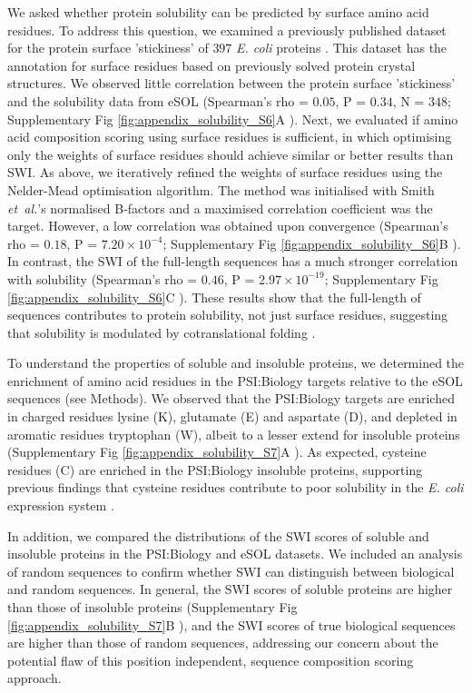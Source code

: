 We asked whether protein solubility can be predicted by surface amino acid residues. To address this question, we examined a previously published dataset for the protein surface 'stickiness’ of $397$ \textit{E. coli} proteins \citep{Levy2012-ct}. This dataset has the annotation for surface residues based on previously solved protein crystal structures. We observed little correlation between the protein surface 'stickiness' and the solubility data from eSOL (Spearman’s rho = $0.05$, P = $0.34$, N = $348$; Supplementary Fig \ref{fig:appendix_solubility_S6}A ). Next, we evaluated if amino acid composition scoring using surface residues is sufficient, in which optimising only the weights of surface residues should achieve similar or better results than SWI. As above, we iteratively refined the weights of surface residues using the Nelder-Mead optimisation algorithm. The method was initialised with Smith {\it et~al.}’s normalised B-factors and a maximised correlation coefficient was the target. However, a low correlation was obtained upon convergence (Spearman’s rho = $0.18$, P = $7.20 \times 10^{-4}$; Supplementary Fig \ref{fig:appendix_solubility_S6}B ). In contrast, the SWI of the full-length sequences has a much stronger correlation with solubility (Spearman’s rho = $0.46$, P = $2.97 \times 10^{-19}$; Supplementary Fig \ref{fig:appendix_solubility_S6}C ). These results show that the full-length of sequences contributes to protein solubility, not just surface residues, suggesting that solubility is modulated by cotranslational folding \citep{Davis1999-ha,Natan2018-hv}.

To understand the properties of soluble and insoluble proteins, we determined the enrichment of amino acid residues in the PSI:Biology targets relative to the eSOL sequences (see Methods). We observed that the PSI:Biology targets are enriched in charged residues lysine (K), glutamate (E) and aspartate (D), and depleted in aromatic residues tryptophan (W), albeit to a lesser extend for insoluble proteins (Supplementary Fig \ref{fig:appendix_solubility_S7}A ). As expected, cysteine residues (C) are enriched in the PSI:Biology insoluble proteins, supporting previous findings that cysteine residues contribute to poor solubility in the \textit{E. coli} expression system \citep{Wilkinson1991-zp,Diaz2010-md}.

In addition, we compared the distributions of the SWI scores of soluble and insoluble proteins in the PSI:Biology and eSOL datasets. We included an analysis of random sequences to confirm whether SWI can distinguish between biological and random sequences. In general, the SWI scores of soluble proteins are higher than those of insoluble proteins (Supplementary Fig \ref{fig:appendix_solubility_S7}B ), and the SWI scores of true biological sequences are higher than those of random sequences, addressing our concern about the potential flaw of this position independent, sequence composition scoring approach.


